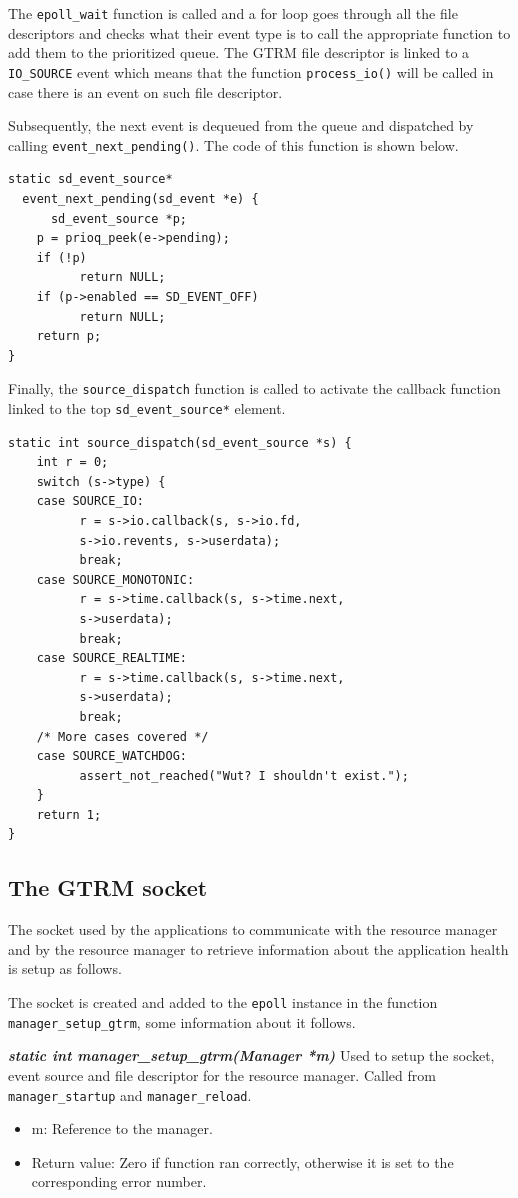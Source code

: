 \documentclass[nobiblatex]{LTHthesis}
\begin{document}
  

The \texttt{epoll\_wait} function is called and a for loop goes through 
all the file descriptors and checks what their event type is to call the
appropriate function to add them to the prioritized queue.
The GTRM file descriptor is linked to a \texttt{IO\_SOURCE} event which 
means that the function \texttt{process\_io()} will be called in case there
is an event on such file descriptor.

Subsequently, the next event is dequeued from the queue and dispatched by
calling \texttt{event\_next\_pending()}. The code of this function is
shown below.
\begin{lstlisting}
static sd_event_source* 
  event_next_pending(sd_event *e) {
	  sd_event_source *p;
  	p = prioq_peek(e->pending);
  	if (!p)
  		  return NULL;
  	if (p->enabled == SD_EVENT_OFF)
  		  return NULL;
  	return p;
}
\end{lstlisting}
Finally, the \texttt{source\_dispatch} function is called to activate 
the callback function linked to the top \texttt{sd\_event\_source*} 
element.
\begin{lstlisting}
static int source_dispatch(sd_event_source *s) {
	int r = 0;
	switch (s->type) {
  	case SOURCE_IO:
  		  r = s->io.callback(s, s->io.fd, 
          s->io.revents, s->userdata);
  		  break;
  	case SOURCE_MONOTONIC:
  		  r = s->time.callback(s, s->time.next, 
          s->userdata);
  		  break;
  	case SOURCE_REALTIME:
  		  r = s->time.callback(s, s->time.next, 
          s->userdata);
  		  break;
  	/* More cases covered */
  	case SOURCE_WATCHDOG:
  		  assert_not_reached("Wut? I shouldn't exist.");
	}
	return 1;
}
\end{lstlisting}

\subsection{The GTRM socket}

The socket used by the applications to communicate with the resource
manager and by the resource manager to retrieve information about the
application health is setup as follows.

The socket is created and added to the \texttt{epoll} instance in the
function \texttt{manager\_setup\_gtrm}, some information about it
follows.

\begin{framed}
	\begin{flushleft}
		\textbf{\emph{{static int manager\_setup\_gtrm(Manager *m)}}} 
    \newline
		Used to setup the socket, event source and file descriptor for the
    resource manager. Called from \texttt{manager\_startup} and 
    \texttt{manager\_reload}.
		\begin{itemize}
		\item m: Reference to the manager.
		\item Return value: Zero if function ran correctly, otherwise it is 
      set to the corresponding error number.
		\end{itemize}
	\end{flushleft}	
\end{framed}
\end{document}
